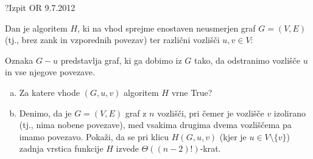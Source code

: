 \begin{naloga}{?}{Izpit OR 9.7.2012}
\begin{vprasanje}
Dan je algoritem $H$,
ki na vhod sprejme enostaven neusmerjen graf $G = (V, E)$
(tj., brez zank in vzporednih povezav)
ter različni vozlišči $u, v \in V$:
\begin{small}
\begin{algorithmic}
        \State {}
    \EndIf
            \State {}
        \EndIf
    \EndFor
    \State {}
\EndFunction
\end{algorithmic}
\end{small}
Oznaka $G - u$ predstavlja graf,
ki ga dobimo iz $G$ tako, da odstranimo vozlišče $u$ in vse njegove povezave.

\begin{enumerate}[(a)]
\item Za katere vhode $(G, u, v)$ algoritem $H$ vrne {\sc True}?

\item Denimo, da je $G = (V, E)$ graf z $n$ vozlišči,
pri čemer je vozlišče $v$ izolirano (tj., nima nobene povezave),
med vsakima drugima dvema vozliščema pa imamo povezavo.
Pokaži, da se pri klicu $H(G, u, v)$ (kjer je $u \in V \setminus \{v\}$)
zadnja vrstica funkcije $H$ izvede $\Theta((n-2)!)$-krat.
\end{enumerate}
\end{vprasanje}
\begin{odgovor}
\end{odgovor}
\end{naloga}


